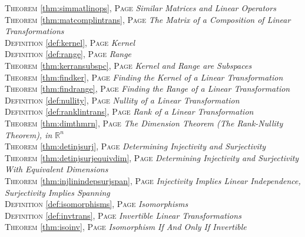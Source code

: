 \begin{multicols}{2}
{\textsc{Theorem} \ref{thm:simmatlinops}, \textsc{Page} \pageref{thm:simmatlinops} \textit{Similar Matrices and Linear Operators} \\
\textsc{Theorem} \ref{thm:matcomplintrans}, \textsc{Page} \pageref{thm:matcomplintrans} \textit{The Matrix of a Composition of Linear Transformations} \\
\textsc{Definition} \ref{def:kernel}, \textsc{Page} \pageref{def:kernel} \textit{Kernel} \\
\textsc{Definition} \ref{def:range}, \textsc{Page} \pageref{def:range} \textit{Range} \\
\textsc{Theorem} \ref{thm:kerransubspc}, \textsc{Page} \pageref{thm:kerransubspc} \textit{Kernel and Range are Subspaces} \\
\textsc{Theorem} \ref{thm:findker}, \textsc{Page} \pageref{thm:findker} \textit{Finding the Kernel of a Linear Transformation} \\
\textsc{Theorem} \ref{thm:findrange}, \textsc{Page} \pageref{thm:findrange} \textit{Finding the Range of a Linear Transformation} \\
\textsc{Definition} \ref{def:nullity}, \textsc{Page} \pageref{def:nullity} \textit{Nullity of a Linear Transformation} \\
\textsc{Definition} \ref{def:ranklintrans}, \textsc{Page} \pageref{def:ranklintrans} \textit{Rank of a Linear Transformation} \\
\textsc{Theorem} \ref{thm:dimthmrn}, \textsc{Page} \pageref{thm:dimthmrn} \textit{The Dimension Theorem (The Rank-Nullity Theorem), in \(\mathbb {R}^n\)} \\
\textsc{Theorem} \ref{thm:detinjsurj}, \textsc{Page} \pageref{thm:detinjsurj} \textit{Determining Injectivity and Surjectivity} \\
\textsc{Theorem} \ref{thm:detinjsurjequivdim}, \textsc{Page} \pageref{thm:detinjsurjequivdim} \textit{Determining Injectivity and Surjectivity With Equivalent Dimensions} \\
\textsc{Theorem} \ref{thm:injlinindepsurjspan}, \textsc{Page} \pageref{thm:injlinindepsurjspan} \textit{Injectivity Implies Linear Independence, Surjectivity Implies Spanning} \\
\textsc{Definition} \ref{def:isomorphisms}, \textsc{Page} \pageref{def:isomorphisms} \textit{Isomorphisms} \\
\textsc{Definition} \ref{def:invtrans}, \textsc{Page} \pageref{def:invtrans} \textit{Invertible Linear Transformations} \\
\textsc{Theorem} \ref{thm:isoinv}, \textsc{Page} \pageref{thm:isoinv} \textit{Isomorphism If And Only If Invertible} \\
}
\end{multicols}
